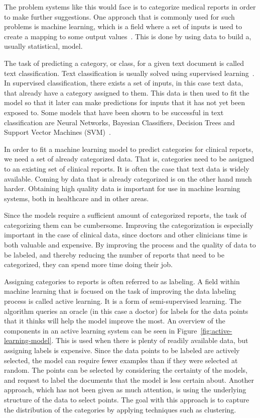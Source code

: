 The problem systems like this would face is to categorize medical reports in order to make further suggestions.
One approach that is commonly used for such problems is machine learning, which is a field where a set of inputs is used to create a mapping to some output values~\cite{bishop2006pattern}.
This is done by using data to build a, usually statistical, model.

The task of predicting a category, or class, for a given text document is called text classification.
Text classification is usually solved using supervised learning~\cite{aggarwal2012surveyclass}. 
In supervised classification, there exists a set of inputs, in this case text data, that already have a category assigned to them.
This data is then used to fit the model so that it later can make predictions for inputs that it has not yet been exposed to.
Some models that have been shown to be successful in text classification are Neural Networks, Bayesian Classifiers, Decision Trees and Support Vector Machines (SVM)~\cite{aggarwal2012surveyclass,joachims1998text, aggarwal2012surveyclass, tong2001support}.

In order to fit a machine learning model to predict categories for clinical reports, we need a set of already categorized data.
That is, categories need to be assigned to an existing set of clinical reports.
It is often the case that text data is widely available.
Coming by data that is already categorized is on the other hand much harder.
Obtaining high quality data is important for use in machine learning systems, both in healthcare and in other areas.

Since the models require a sufficient amount of categorized reports, the task of categorizing them can be cumbersome.
Improving the categorization is especially important in the case of clinical data, since doctors and other clinicians time is both valuable and expensive.
By improving the process and the quality of data to be labeled, and thereby reducing the number of reports that need to be categorized, they can spend more time doing their job.

Assigning categories to reports is often referred to as labeling.
A field within machine learning that is focused on the task of improving the data labeling process is called active learning.
It is a form of semi-supervised learning.
The algorithm queries an oracle (in this case a doctor) for labels for the data points that it thinks will help the model improve the most.
An overview of the components in an active learning system can be seen in Figure~\ref{fig:active-learning-model}.
This is used when there is plenty of readily available data, but assigning labels is expensive.
Since the data points to be labeled are actively selected, the model can require fewer examples than if they were selected at random.
The points can be selected by considering the certainty of the models, and request to label the documents that the model is less certain about.
Another approach, which has not been given as much attention, is using the underlying structure of the data to select points.
The goal with this approach is to capture the distribution of the categories by applying techniques such as clustering.

